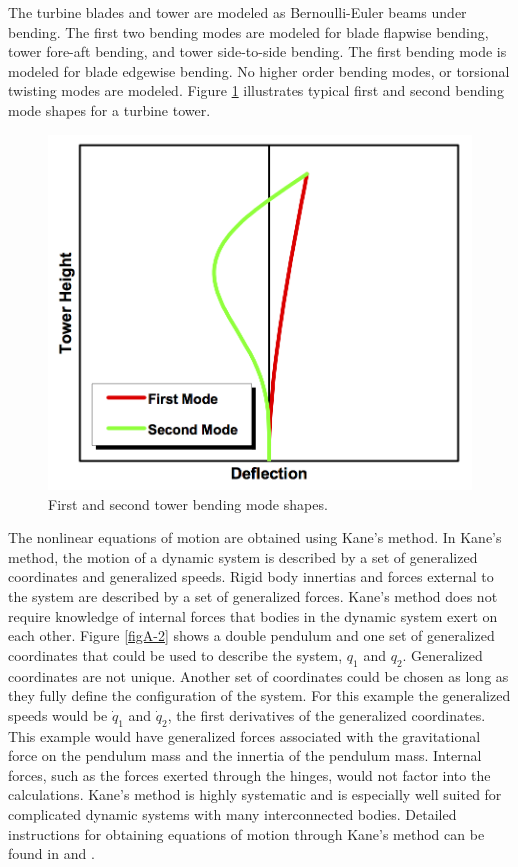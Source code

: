 The turbine blades and tower are modeled as Bernoulli-Euler beams under bending. The first two bending modes are modeled for blade flapwise bending, tower fore-aft bending, and tower side-to-side bending. The first bending mode is modeled for blade edgewise bending. No higher order bending modes, or torsional twisting modes are modeled. Figure \ref{figA-4} illustrates typical first and second bending mode shapes for a turbine tower.

\begin{figure}[ht]
	\centering
		\includegraphics[width=.5\linewidth]{Figures/AppendixAFigures/figA-4.png}
	\caption{First and second tower bending mode shapes.\cite{jonkman2005}}
	\label{figA-4}
\end{figure}

The nonlinear equations of motion are obtained using Kane's method. In Kane's method, the motion of a dynamic system is described by a set of generalized coordinates and generalized speeds. Rigid body innertias and forces external to the system are described by a set of generalized forces. Kane's method does not require knowledge of internal forces that bodies in the dynamic system exert on each other. Figure \ref{figA-2} shows a double pendulum and one set of generalized coordinates that could be used to describe the system, $q_1$ and $q_2$. Generalized coordinates are not unique. Another set of coordinates could be chosen as long as they fully define the configuration of the system. For this example the generalized speeds would be $\dot{q}_1$ and $\dot{q}_2$, the first derivatives of the generalized coordinates. This example would have generalized forces associated with the gravitational force on the pendulum mass and the innertia of the pendulum mass. Internal forces, such as the forces exerted through the hinges, would not factor into the calculations. Kane's method is highly systematic and is especially well suited for complicated dynamic systems with many interconnected bodies. Detailed instructions for obtaining equations of motion through Kane's method can be found in \cite{kane1985} and \cite{roithmayr2016}.

